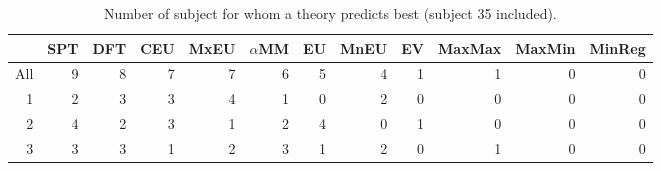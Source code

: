 \begin{table}[!htb]
\centering
\begin{tabular}{rrrrrrrrrrrr}
  \hline
 & SPT & DFT & CEU & MxEU & $\alpha$MM & EU & MnEU & EV & MaxMax & MaxMin & MinReg \\ 
  \hline
All & 9 & 8 & 7 & 7 & 6 & 5 & 4 & 1 & 1 & 0 & 0 \\ 
  1 & 2 & 3 & 3 & 4 & 1 & 0 & 2 & 0 & 0 & 0 & 0 \\ 
  2 & 4 & 2 & 3 & 1 & 2 & 4 & 0 & 1 & 0 & 0 & 0 \\ 
  3 & 3 & 3 & 1 & 2 & 3 & 1 & 2 & 0 & 1 & 0 & 0 \\ 
   \hline
\end{tabular}
\caption{Number of subject for whom a theory predicts best (subject 35 included).} 
\label{table_A_winners_with_SPT}
\end{table}
